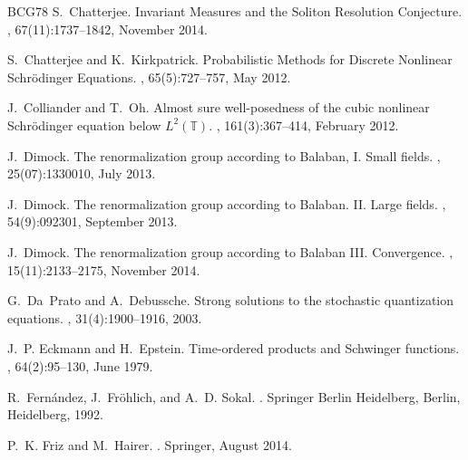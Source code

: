 \documentclass[a4paper,11pt]{article}
\numberwithin{equation}{section}
\begin{document}
\begin{thebibliography}{BCG{\etalchar{+}}78}
S.~Chatterjee.
\newblock Invariant {Measures} and the {Soliton} {Resolution} {Conjecture}.
,
  67(11):1737--1842, November 2014.

S.~Chatterjee and K.~Kirkpatrick.
\newblock Probabilistic {Methods} for {Discrete} {Nonlinear} {Schr\"odinger}
  {Equations}.
, 65(5):727--757,
  May 2012.

J.~Colliander and T.~Oh.
\newblock Almost sure well-posedness of the cubic nonlinear {Schr\"odinger}
  equation below ${L}^2(\mathbb{T})$.
, 161(3):367--414, February 2012.

J.~Dimock.
\newblock The renormalization group according to {Balaban}, {I}. {Small}
  fields.
, 25(07):1330010, July 2013.

J.~Dimock.
\newblock The renormalization group according to {Balaban}. {II}. {Large}
  fields.
, 54(9):092301, September 2013.

J.~Dimock.
\newblock The renormalization group according to {Balaban} {III}.
  {Convergence}.
, 15(11):2133--2175, November 2014.

G.~Da~Prato and A.~Debussche.
\newblock Strong solutions to the stochastic quantization equations.
, 31(4):1900--1916, 2003.

J.~P. Eckmann and H.~Epstein.
\newblock Time-ordered products and {Schwinger} functions.
, 64(2):95--130, June
  1979.

R.~Fern\'andez, J.~Fr\"ohlich, and A.~D. Sokal.
.
\newblock Springer Berlin Heidelberg, Berlin, Heidelberg, 1992.

P.~K. Friz and M.~Hairer.
.
\newblock Springer, August 2014.


\end{thebibliography}
\end{document}
